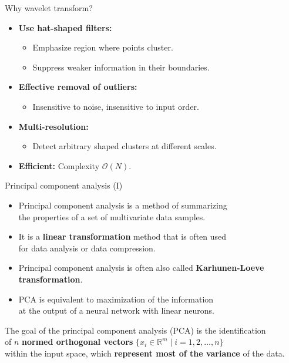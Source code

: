 \documentclass[aspectratio=169,t]{beamer}
\begin{document}
  {
    \begin{frame}{Why wavelet transform?}
    \begin{itemize}
      \item \textbf{Use hat-shaped filters:}
      \begin{itemize}
        \item Emphasize region where points cluster.
        \item Suppress weaker information in their boundaries.
      \end{itemize}
      \item \textbf{Effective removal of outliers:}
      \begin{itemize}
        \item Insensitive to noise, insensitive to input order.
      \end{itemize}
      \item \textbf{Multi-resolution:}
      \begin{itemize}
        \item Detect arbitrary shaped clusters at different scales.
      \end{itemize}
      \item \textbf{Efficient:} Complexity $\mathcal{O}(N)$.
    \end{itemize}
    \end{frame}
  }

  {
    \begin{frame}{Principal component analysis (I)}
    \begin{itemize}
      \item Principal component analysis is a method of summarizing \\
      the properties of a set of multivariate data samples.
      \item It is a \textbf{linear transformation} method that is often used \\ for data analysis or data compression.
      \item Principal component analysis is often also called \textbf{Karhunen-Loeve transformation}.
      \item PCA is equivalent to maximization of the information \\ at the output of a neural network with linear neurons.
    \end{itemize}
    \vspace{0.5cm}
    The goal of the principal component analysis (PCA) is the identification \\
    of $n$ \textbf{normed orthogonal vectors} $\{x_i \in \mathbb{R}^m \; \vert \; i = 1,2, \ldots,n \}$ \\
    within the input space, which \textbf{represent most of the variance} of the data.
    \end{frame}
  }
\end{document}
